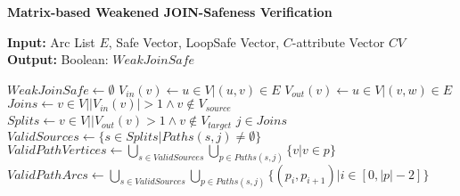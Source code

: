 \documentclass{article}
\begin{document}
    \begin{algorithm}[H]
    \caption{\textbf{Matrix-based Weakened JOIN-Safeness Verification}} 
    \textbf{Input:} Arc List $E$, Safe Vector, LoopSafe Vector, $C$-attribute Vector $CV$
    \textbf{Output:} Boolean: $WeakJoinSafe$
        \begin{algorithmic}[1]
            \State$WeakJoinSafe \gets \emptyset$
            \State$V_{in}(v) \gets {u \in V | (u, v) \in E}$
            \State$V_{out}(v) \gets {u \in V | (v, w) \in E}$
            \State$Joins \gets {v \in V | |V_{in}(v)| > 1 \land v \notin V_{source}}$
            \State$Splits \gets {v \in V | |V_{out}(v) > 1 \land v \notin V_{target}}$
            \ForAll$j \in Joins$
                \State$ValidSources \gets \{s \in Splits | Paths(s, j) \neq \emptyset\}$
                \State$ValidPathVertices \gets \bigcup_{s \in ValidSources}\bigcup_{p \in Paths(s,j)}\{v | v \in p\}$ 
                \State$ValidPathArcs\gets \bigcup_{s \in ValidSources}\bigcup_{p \in Paths(s,j)}\{(p_i, p_{i+1}) | i \in [0, |p| - 2]\}$ 
                
            \EndFor
        \end{algorithmic}
    \end{algorithm}
\end{document}
